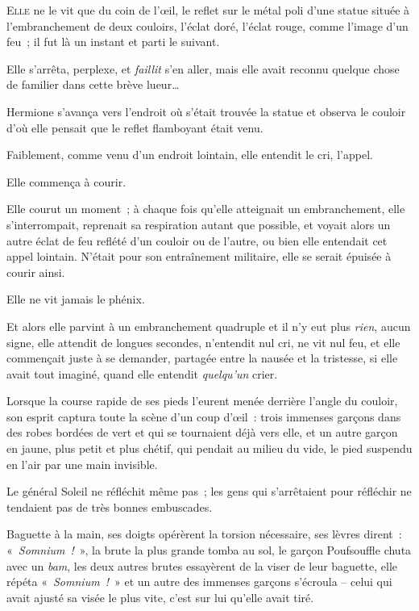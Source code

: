 
\lettrine{E}{lle} ne le vit que du coin de l'œil, le reflet sur le métal poli d'une statue située à l'embranchement de deux couloirs, l'éclat doré, l'éclat rouge, comme l'image d'un feu~; il fut là un instant et parti le suivant.

Elle s'arrêta, perplexe, et \emph{faillit} s'en aller, mais elle avait reconnu quelque chose de familier dans cette brève lueur…

Hermione s'avança vers l'endroit où s'était trouvée la statue et observa le couloir d'où elle pensait que le reflet flamboyant était venu.

Faiblement, comme venu d'un endroit lointain, elle entendit le cri, l'appel.

Elle commença à courir.

Elle courut un moment~; à chaque fois qu'elle atteignait un embranchement, elle s'interrompait, reprenait sa respiration autant que possible, et voyait alors un autre éclat de feu reflété d'un couloir ou de l'autre, ou bien elle entendait cet appel lointain. N'était pour son entraînement militaire, elle se serait épuisée à courir ainsi.

Elle ne vit jamais le phénix.

Et alors elle parvint à un embranchement quadruple et il n'y eut plus \emph{rien}, aucun signe, elle attendit de longues secondes, n'entendit nul cri, ne vit nul feu, et elle commençait juste à se demander, partagée entre la nausée et la tristesse, si elle avait tout imaginé, quand elle entendit \emph{quelqu'un} crier.

Lorsque la course rapide de ses pieds l'eurent menée derrière l'angle du couloir, son esprit captura toute la scène d'un coup d'œil~: trois immenses garçons dans des robes bordées de vert et qui se tournaient déjà vers elle, et un autre garçon en jaune, plus petit et plus chétif, qui pendait au milieu du vide, le pied suspendu en l'air par une main invisible.

Le général Soleil ne réfléchit même pas~; les gens qui s'arrêtaient pour réfléchir ne tendaient pas de très bonnes embuscades.

Baguette à la main, ses doigts opérèrent la torsion nécessaire, ses lèvres dirent~: «~\emph{Somnium~!}~», la brute la plus grande tomba au sol, le garçon Poufsouffle chuta avec un \emph{bam}, les deux autres brutes essayèrent de la viser de leur baguette, elle répéta «~\emph{Somnium~!}~» et un autre des immenses garçons s'écroula -- celui qui avait ajusté sa visée le plus vite, c'est sur lui qu'elle avait tiré.

